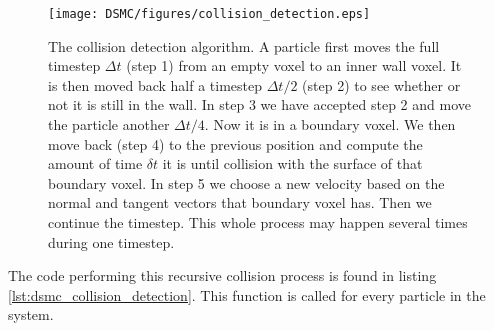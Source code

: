 \begin{figure}[h]
\begin{center}
\texttt{[image: DSMC/figures/collision\_detection.eps]}
\end{center}
\caption{The collision detection algorithm. A particle first moves the full timestep $\Delta t$ (step 1) from an empty voxel to an inner wall voxel. It is then moved back half a timestep  $\Delta t/2$ (step 2) to see whether or not it is still in the wall. In step 3 we have accepted step 2 and move the particle another $\Delta t/4$. Now it is in a boundary voxel. We then move back (step 4) to the previous position and compute the amount of time $\delta t$ it is until collision with the surface of that boundary voxel. In step 5 we choose a new velocity based on the normal and tangent vectors that boundary voxel has. Then we continue the timestep. This whole process may happen several times during one timestep. }
\label{fig:dsmc_collision_detection}
\end{figure}
The code performing this recursive collision process is found in listing \ref{lst:dsmc_collision_detection}. This function is called for every particle in the system.
